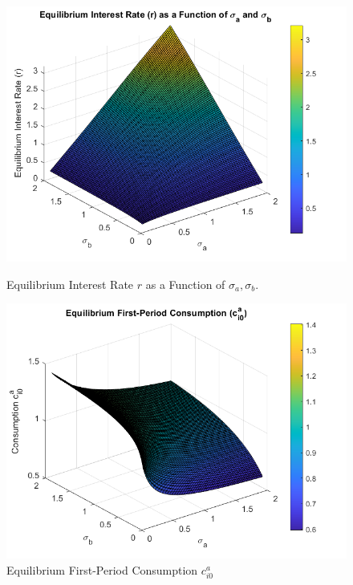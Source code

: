 \documentclass[12pt]{article}
\begin{document}
\begin{enumerate}
\begin{figure}[h!]
    \centering
    \begin{minipage}{0.45\textwidth}
        \centering
        \includegraphics[width=\textwidth]{2b_2.png}
        \caption{Equilibrium Interest Rate $r$ as a Function of $\sigma_a, \sigma_b$.}
        \label{fig:2b_2}
    \end{minipage}
    \hfill
    \begin{minipage}{0.45\textwidth}
        \centering
        \includegraphics[width=\textwidth]{2b.png}
        \caption{Equilibrium First-Period Consumption $c_{i0}^a$}
        \label{fig:2b}
    \end{minipage}
    \label{fig:bond_holdings}
\end{figure}


\end{enumerate}
\end{document}
